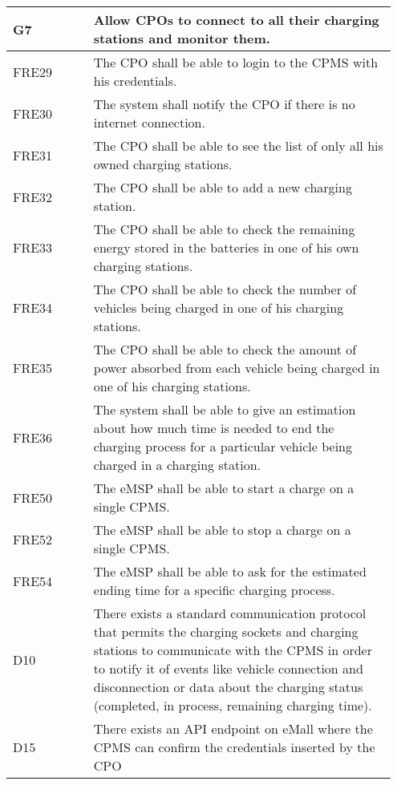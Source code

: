 \begin{longtable}{|p{0.20\linewidth}p{0.75\linewidth}|}
    \hline
    \rowcolor{bluepoli!40}\textbf{G7} & \textbf{Allow CPOs to connect to all their charging stations and monitor them.} \\
    \hline
    \rowcolor{bluepoli!15} FRE29 & The CPO shall be able to login to the CPMS with his credentials.\\
    \hline
    \rowcolor{bluepoli!15} FRE30 &  The system shall notify the CPO if there is no internet connection.\\
    \hline
    \rowcolor{bluepoli!15} FRE31 & The CPO shall be able to see the list of only all his owned charging stations.\\
    \hline
    \rowcolor{bluepoli!15} FRE32& The CPO shall be able to add a new charging station.\\
    \hline
    \rowcolor{bluepoli!15} FRE33 & The CPO shall be able to check the remaining energy stored in the batteries in one of his own charging stations.\\
    \hline
    \rowcolor{bluepoli!15} FRE34& The CPO shall be able to check the number of vehicles being charged in one of his charging stations.\\
    \hline
    \rowcolor{bluepoli!15} FRE35& The CPO shall be able to check the amount of power absorbed from each vehicle being charged in one of his charging stations.\\
    \hline
    \rowcolor{bluepoli!15} FRE36& The system shall be able to give an estimation about how much time is needed to end the charging process for a particular vehicle being charged in a charging station.\\
    \hline
    \rowcolor{bluepoli!15} FRE50 & The eMSP shall be able to start a charge on a single CPMS.\\
    \hline
    \rowcolor{bluepoli!15} FRE52 & The eMSP shall be able to stop a charge on a single CPMS.\\
    \hline
    \rowcolor{bluepoli!15} FRE54& The eMSP shall be able to ask for the estimated ending time for a specific charging process.\\
    \hline
    \rowcolor{bluepoli!5} D10 & There exists a standard communication protocol that permits the charging sockets and charging stations to communicate with the CPMS in order to notify it of events like vehicle connection and disconnection or data about the charging status (completed, in process, remaining charging time). \\
    \hline 
    \rowcolor{bluepoli!5} D15& There exists an API endpoint on eMall where the CPMS can confirm the credentials inserted by the CPO\\
    \hline
\end{longtable}
